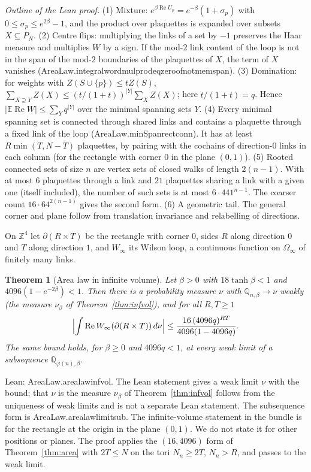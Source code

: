 \documentclass[11pt,a4paper]{article}
\newtheorem{theorem}{Theorem}[section]
\theoremstyle{definition}
\theoremstyle{remark}
\newcommand{\leanus}{\textunderscore\allowbreak{}}
\newcommand{\leandot}{.\allowbreak{}}
\newcommand{\lean}[1]{{\ttfamily\let\_\leanus #1}}
\newcommand{\Z}{\mathbb{Z}}
\renewcommand{\Re}{\operatorname{Re}}
\begin{document}
\emph{Outline of the Lean proof.} (1) Mixture: $e^{\beta\Re U_p}=e^{-\beta}(1+\sigma_p)$ with $0\le\sigma_p\le e^{2\beta}-1$, and the product over plaquettes is expanded over subsets $X\subseteq P_N$. (2) Centre flips: multiplying the links of a set by $-1$ preserves the Haar measure and multiplies $W$ by a sign. If the mod-$2$ link content of the loop is not in the span of the mod-$2$ boundaries of the plaquettes of $X$, the term of $X$ vanishes (\lean{AreaLaw\leandot{}integral\_word\_mul\_prod\_eq\_zero\_of\_not\_mem\_span}). (3) Domination: for weights with $Z(S\cup\{p\})\le tZ(S)$, $\sum_{X\supseteq Y}Z(X)\le(t/(1+t))^{|Y|}\sum_XZ(X)$; here $t/(1+t)=q$. Hence $|\mathbb E\Re W|\le\sum_Yq^{|Y|}$ over the minimal spanning sets $Y$. (4) Every minimal spanning set is connected through shared links and contains a plaquette through a fixed link of the loop (\lean{AreaLaw\leandot{}minSpan\_rect\_conn}). It has at least $R\min(T,N-T)$ plaquettes, by pairing with the cochains of direction-$0$ links in each column (for the rectangle with corner $0$ in the plane $(0,1)$). (5) Rooted connected sets of size $n$ are vertex sets of closed walks of length $2(n-1)$. With at most $6$ plaquettes through a link and $21$ plaquettes sharing a link with a given one (itself included), the number of such sets is at most $6\cdot441^{n-1}$. The coarser count $16\cdot64^{2(n-1)}$ gives the second form. (6) A geometric tail. The general corner and plane follow from translation invariance and relabelling of directions.

On $\Z^4$ let $\partial(R\times T)$ be the rectangle with corner $0$, sides $R$ along direction $0$ and $T$ along direction $1$, and $W_\infty$ its Wilson loop, a continuous function on $\Omega_\infty$ of finitely many links.

\begin{theorem}[Area law in infinite volume]\label{thm:areainf}
Let $\beta>0$ with $18\tanh\beta<1$ and $4096(1-e^{-2\beta})<1$. Then there is a probability measure $\nu$ with $\mathbb Q_{n,\beta}\to\nu$ weakly (the measure $\nu_\beta$ of Theorem~\ref{thm:infvol}), and for all $R,T\ge1$
\[
\Bigl|\int\Re W_\infty(\partial(R\times T))\,d\nu\Bigr|\le\frac{16\,(4096q)^{RT}}{4096(1-4096q)}.
\]
The same bound holds, for $\beta\ge0$ and $4096q<1$, at every weak limit of a subsequence $\mathbb Q_{\varphi(n),\beta}$.
\end{theorem}
Lean: \lean{AreaLaw\leandot{}area\_law\_infvol}. The Lean statement gives a weak limit $\nu$ with the bound; that $\nu$ is the measure $\nu_\beta$ of Theorem~\ref{thm:infvol} follows from the uniqueness of weak limits and is not a separate Lean statement. The subsequence form is \lean{AreaLaw\leandot{}area\_law\_limit\_sub}. The infinite-volume statement in the bundle is for the rectangle at the origin in the plane $(0,1)$. We do not state it for other positions or planes. The proof applies the $(16,4096)$ form of Theorem~\ref{thm:area} with $2T\le N$ on the tori $N_n\ge 2T$, $N_n>R$, and passes to the weak limit.
\end{document}
